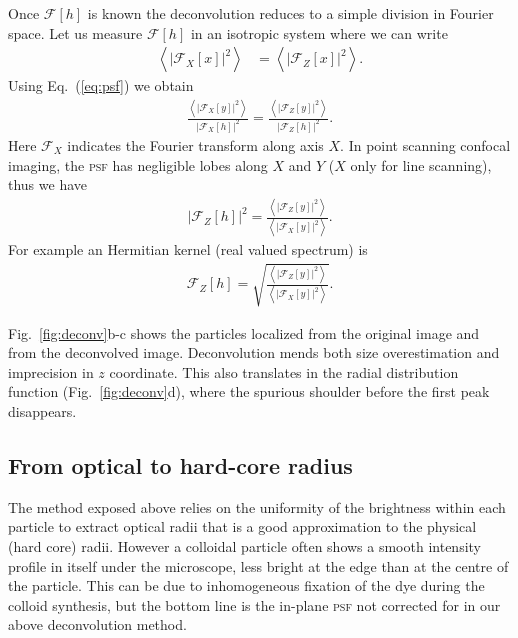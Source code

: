 \documentclass[8.5pt,twoside,twocolumn]{article}
\begin{document}
Once $\mathcal{F}[h]$ is known the deconvolution reduces to a simple division in Fourier space. Let us measure $\mathcal{F}[h]$ in an isotropic system where we can write
\begin{eqnarray}
\left\langle \left|\mathcal{F}_X[x]\right|^2 \right\rangle  &= \left\langle \left|\mathcal{F}_Z[x]\right|^2 \right\rangle. 
\end{eqnarray}
Using Eq.~(\ref{eq:psf}) we obtain 
\begin{eqnarray}
\frac{\left\langle\left|\mathcal{F}_X[y]\right|^2 \right\rangle}{\left|\mathcal{F}_X[h]\right|^2}  = \frac{\left\langle \left|\mathcal{F}_Z[y]\right|^2\right\rangle}{\left|\mathcal{F}_Z[h]\right|^2}. 
\end{eqnarray}
Here $\mathcal{F}_X$ indicates the Fourier transform along axis $X$. In point scanning confocal imaging, the \textsc{psf} has negligible lobes along $X$ and $Y$ ($X$ only for line scanning), thus we have 
\begin{eqnarray}
\left|\mathcal{F}_Z[h]\right|^2 = \frac{\left\langle \left|\mathcal{F}_Z[y]\right|^2\right\rangle}{\left\langle\left|\mathcal{F}_X[y]\right|^2 \right\rangle}.
\end{eqnarray}
For example an Hermitian kernel (real valued spectrum) is 
\begin{eqnarray}
\mathcal{F}_Z[h] = \sqrt{\frac{\left\langle \left|\mathcal{F}_Z[y]\right|^2\right\rangle}{\left\langle\left|\mathcal{F}_X[y]\right|^2 \right\rangle}}.
\end{eqnarray}

Fig.~\ref{fig:deconv}b-c shows the particles localized from the original image and from the deconvolved image. Deconvolution mends both size overestimation and imprecision in $z$ coordinate. This also translates in the radial distribution function (Fig.~\ref{fig:deconv}d), where the spurious shoulder before the first peak disappears.

\subsection{From optical to hard-core radius}

The method exposed above relies on the uniformity of the brightness within each particle to extract optical radii that is a good approximation to the physical (hard core) radii. However a colloidal particle often shows a smooth intensity profile in itself under the microscope, less bright at the edge than at the centre of the particle. This can be due to inhomogeneous fixation of the dye during the colloid synthesis, but the bottom line is the in-plane \textsc{psf} not corrected for in our above deconvolution method.
\end{document}
